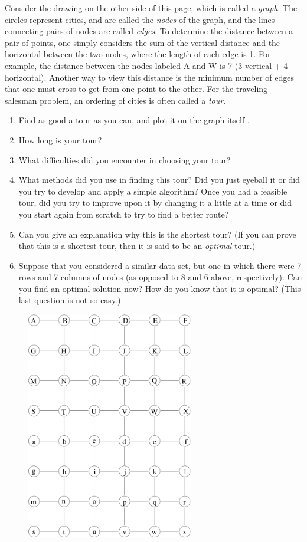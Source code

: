\documentclass[twoside]{article}%
\begin{document}
Consider the drawing on the other side of this page, which is called a 
{\it graph}.
The circles represent cities, and are called the {\it nodes} of 
the graph, and the lines connecting pairs of nodes are called {\it edges}.
To determine the distance between a pair of points, one simply considers
the sum of the vertical distance and the horizontal between the two
nodes, where the length of each edge is 1. For example, the 
distance between the nodes labeled A and W
is 7 (3 vertical + 4 horizontal). Another way to view this distance
is the minimum number of edges that one must cross to get from one
point to the other.
For the traveling salesman problem, an ordering of cities is often
called a {\it tour}. 
\begin{enumerate}
\item   Find as good a tour as you can, and plot it on the graph itself .

\medskip
\item   How long is your tour?

\medskip
\item   What difficulties did you encounter in choosing your tour?
 
\medskip
\item   What methods did you use in finding this tour? 
Did you just eyeball it or did
you try to develop and apply a simple algorithm? Once you had a feasible
tour, did you try to improve upon it by changing it a little at a time or 
did you start again from scratch to try to find a better route?
\medskip
\item Can you give an explanation why this is the shortest tour?
(If you can prove that this is a shortest tour, then it is said
to be an {\it optimal} tour.)
\bigskip
\item Suppose that you considered a similar data set, but one in
which there were 7 rows and 7 columns of nodes (as opposed to 8 and 6
above, respectively). Can you find an optimal solution now?
How do you know that it is optimal? (This last question is not so easy.)
\end{enumerate}
\begin{figure}
\begin{center}
\includegraphics[height=10cm]{grid68.pdf}
\end{center}\end{figure}
\end{document}
